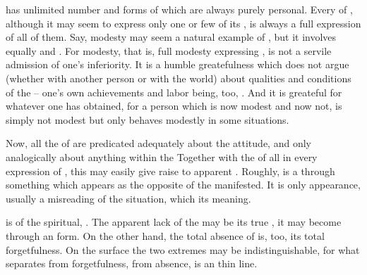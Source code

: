 \label{pa:inversion}
\label{pa:allaspects}  has unlimited number and forms of
 which are always purely personal.  Every  of , although it may seem to express only one or few
of its , is always a full expression of all of them.  Say, modesty
may seem a natural example of , but it involves equally
 and . For modesty, that is, full modesty
expressing , is not a servile admission of one's inferiority. It is
a humble greatefulness which does not argue (whether with another person
or with the world) about qualities and conditions of the  -- one's own
achievements and labor being, too, .
And it is greateful for
whatever one has obtained, for a person which is now modest and now not, is
simply not modest but only behaves modestly in some
situations.

\pa Now, all the  of  are predicated
adequately about the  attitude, and only analogically about
anything within the  Together with the  of all
 in every expression of , this may easily give
raise to apparent . Roughly,  is a 
through something which appears as the opposite of the manifested. It is only
appearance, usually a misreading of the situation, which  its
meaning. 

 is  of the spiritual,
.  The apparent lack of the  may be its true
, it may become  through an  form.
On the other hand, the total absence of  is, too, its total
forgetfulness. On the surface the two extremes may be indistinguishable, for
what separates  from forgetfulness,  from
absence, is an  thin line.

